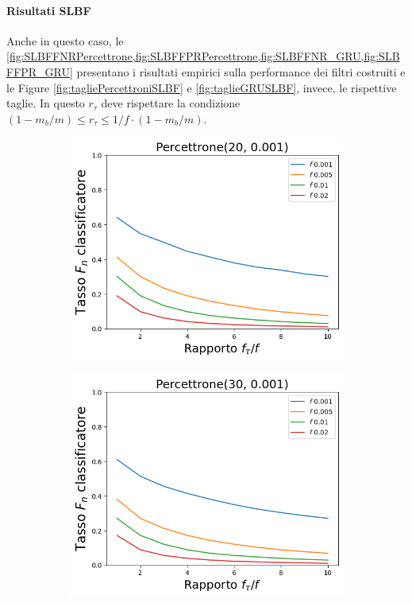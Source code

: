 \documentclass[../../main.tex]{subfiles}
\begin{document}
    \paragraph{Risultati SLBF}
    Anche in questo caso, le \cref{fig:SLBFFNRPercettrone,fig:SLBFFPRPercettrone,fig:SLBFFNR_GRU,fig:SLBFFPR_GRU}  presentano i risultati empirici sulla performance dei filtri costruiti e le Figure \ref{fig:tagliePercettroniSLBF} e \ref{fig:taglieGRUSLBF}, invece, le rispettive taglie. In questo $r_{\tau}$ deve rispettare la condizione $(1 - m_b/m) \leq r_{\tau} \leq 1/f \cdot \left(1 - m_b/m\right)$.
    \begin{figure}[H]
        \centering
        \begin{subfigure}[b]{0.49\textwidth}
            \centering
            \includegraphics[width = \textwidth]{immagini/7/SLBF/Percettrone(20, 0.001)_FNR.png}
            \caption{}
            \label{fig:SLBFFNRPercettrone20}
        \end{subfigure}
        \begin{subfigure}[b]{0.49\textwidth}
            \centering
            \includegraphics[width = \textwidth]{immagini/7/SLBF/Percettrone(30, 0.001)_FNR.png}

\end{subfigure}
\end{figure}
\end{document}
